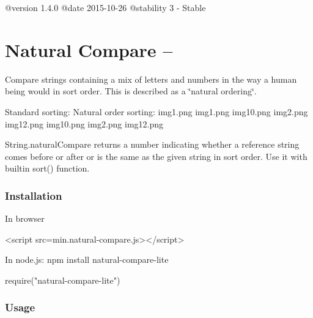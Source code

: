\begin{DoxyVerb}@version    1.4.0
@date       2015-10-26
@stability  3 - Stable
\end{DoxyVerb}


\section*{Natural Compare -- \href{https://travis-ci.org/litejs/natural-compare-lite}{\tt } \href{https://coveralls.io/r/litejs/natural-compare-lite}{\tt } }

Compare strings containing a mix of letters and numbers in the way a human being would in sort order. This is described as a \char`\"{}natural ordering\char`\"{}.


\begin{DoxyCode}
Standard sorting:   Natural order sorting:
    img1.png            img1.png
    img10.png           img2.png
    img12.png           img10.png
    img2.png            img12.png
\end{DoxyCode}


String.\+natural\+Compare returns a number indicating whether a reference string comes before or after or is the same as the given string in sort order. Use it with builtin sort() function.

\subsubsection*{Installation}


\begin{DoxyItemize}
\item In browser
\end{DoxyItemize}


\begin{DoxyCode}
<script src=min.natural-compare.js></script>
\end{DoxyCode}



\begin{DoxyItemize}
\item In node.\+js\+: {\ttfamily npm install natural-\/compare-\/lite}
\end{DoxyItemize}


\begin{DoxyCode}
require("natural-compare-lite")
\end{DoxyCode}


\subsubsection*{Usage}


